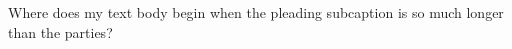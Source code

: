 \documentclass[12pt]{article}
\begin{document}
\makecaption

Where does my text body begin when the pleading subcaption is so much longer than the parties?
\end{document}
